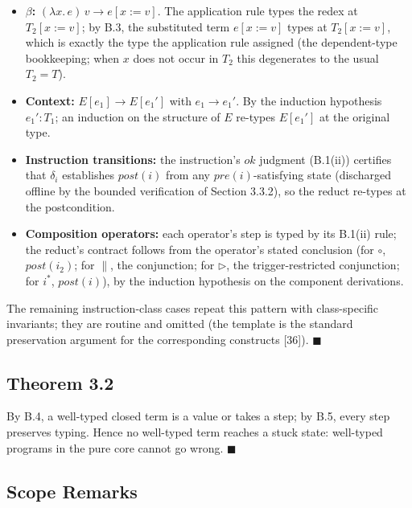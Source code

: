 \documentclass[
  11pt,
]{article}
\providecommand{\tightlist}{%
  \setlength{\itemsep}{0pt}\setlength{\parskip}{0pt}}
\begin{document}
\begin{itemize}
\tightlist
\item
  \textbf{\(\beta\):} \((\lambda x.\,e)\,v \rightarrow e[x := v]\). The
  application rule types the redex at \(T_2[x := v]\); by B.3, the
  substituted term \(e[x := v]\) types at \(T_2[x := v]\), which is
  exactly the type the application rule assigned (the dependent-type
  bookkeeping; when \(x\) does not occur in \(T_2\) this degenerates to
  the usual \(T_2 = T\)).
\item
  \textbf{Context:} \(E[e_1] \rightarrow E[e_1']\) with
  \(e_1 \rightarrow e_1'\). By the induction hypothesis \(e_1' : T_1\);
  an induction on the structure of \(E\) re-types \(E[e_1']\) at the
  original type.
\item
  \textbf{Instruction transitions:} the instruction's \(\mathit{ok}\)
  judgment (B.1(ii)) certifies that \(\delta_i\) establishes \(post(i)\)
  from any \(pre(i)\)-satisfying state (discharged offline by the
  bounded verification of Section 3.3.2), so the reduct re-types at the
  postcondition.
\item
  \textbf{Composition operators:} each operator's step is typed by its
  B.1(ii) rule; the reduct's contract follows from the operator's stated
  conclusion (for \(\circ\), \(post(i_2)\); for \(\parallel\), the
  conjunction; for \(\triangleright\), the trigger-restricted
  conjunction; for \(i^*\), \(post(i)\)), by the induction hypothesis on
  the component derivations.
\end{itemize}

The remaining instruction-class cases repeat this pattern with
class-specific invariants; they are routine and omitted (the template is
the standard preservation argument for the corresponding constructs
{[}36{]}). \(\blacksquare\)

\subsection{Theorem 3.2}\label{theorem-3.2}

By B.4, a well-typed closed term is a value or takes a step; by B.5,
every step preserves typing. Hence no well-typed term reaches a stuck
state: well-typed programs in the pure core cannot go wrong.
\(\blacksquare\)

\subsection{Scope Remarks}\label{scope-remarks}
\end{document}

